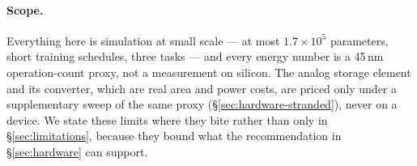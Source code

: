 \paragraph{Scope.} Everything here is simulation at small scale --- at most $1.7\times10^5$
parameters, short training schedules, three tasks --- and every energy number is a 45\,nm
operation-count proxy, not a measurement on silicon. The analog storage element and its converter,
which are real area and power costs, are priced only under a supplementary sweep of the same
proxy (\S\ref{sec:hardware-stranded}), never on a device. We state these limits
where they bite rather than only in \S\ref{sec:limitations}, because they bound what the
recommendation in \S\ref{sec:hardware} can support.
